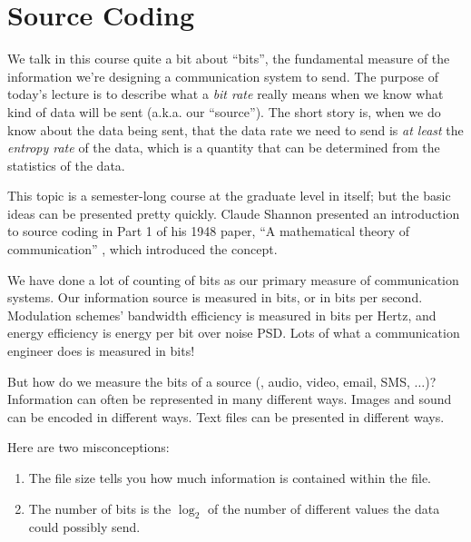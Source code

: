 


\section{Source Coding}

We talk in this course quite a bit about ``bits'', the fundamental measure of the information we're designing a communication system to send.  The purpose of today's lecture is to describe what a \emph{bit rate} really means when we know what kind of data will be sent (a.k.a. our ``source'').  The short story is, when we do know about the data being sent, that the data rate we need to send is \emph{at least} the \emph{entropy rate} of the data, which is a quantity that can be determined from the statistics of the data.

This topic is a semester-long course at the graduate level in
itself; but the basic ideas can be presented pretty quickly.  Claude Shannon presented an introduction to source coding in Part 1 of his 1948 paper, ``A mathematical theory of communication'' \cite{shannon1948mathematical}, which introduced the concept.

We have done a lot of counting of bits as our primary measure of
communication systems.  Our information source is measured in bits,
or in bits per second.  Modulation schemes' bandwidth efficiency is
measured in bits per Hertz, and energy efficiency is energy per bit
over noise PSD.  Lots of what a communication engineer does is measured in bits!

But how do we measure the bits of a source (\eg, audio, video, email, SMS, $\ldots$)?  Information can often be represented in many different ways. Images and sound can be encoded in different ways.  Text files can be presented in different ways.

Here are two misconceptions:
\begin{enumerate}
  \item The file size tells you how much information is contained within the file.
  \item The number of bits is the $\log_2$ of the number of different values the data could possibly send.
\end{enumerate}

